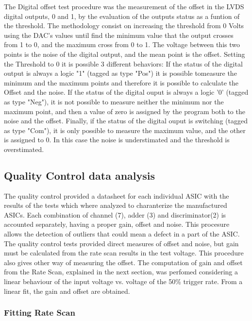 \documentclass[a4paper,10pt]{book}
\begin{document}
The Digital offset test procedure was the measurement of the offset in the LVDS digital outputs, 0
and 1, by the evaluation of the outputs status as a funtion of the threshold.
The methodology consist on increasing the threshold from 0 Volts using the DAC's values until find
the minimum value that the output crosses from 1 to 0, and the maximum cross from 0 to 1. The
voltage between this two points is the noise of the digital output, and the mean point is the offset.
Setting the Threshold to 0 it is possible 3 different behaviors:
If the status of the digital output is always a logic "1" (tagged as type "Pos") it is possible tomeasure the minimum and the maximum points and therefore it is possible to calculate the Offset
and the noise.
If the status of the digital ouput is always a logic '0' (tagged as type "Neg"), it is not possible to
measure neither the minimum nor the maximum point, and then a value of zero is assigned by the
program both to the noise and the offset.
Finally, if the status of the digital ouput is switching (tagged as type "Com"), it is only possible to
measure the maximum value, and the other is assigned to 0. In this case the noise is
understimated and the threshold is overstimated.

\subsection{Quality Control data analysis}

The quality control provided a datasheet for each individual ASIC with the results of the tests which where analyzed to charanterize the manufactured ASICs. Each combination of channel (7), adder (3) 
and discriminator(2) is accounted separately, having a proper gain, offset and noise. This procesure allows the detection of outliers that could mean a defect in a part of the ASIC.
The quality control tests provided direct measures of  offset and noise, but gain must be calculated from the rate scan results in the test voltage. This procedure also gives other way of measuring the offset. 
The computation of gain and offset from the Rate Scan, explained in the next section, was perfomed considering a linear behaviour of the input voltage vs. voltage of the 50\% trigger rate. From a linear fit, the gain and offset 
are obtained.   

\subsubsection{Fitting Rate Scan}
\end{document}
